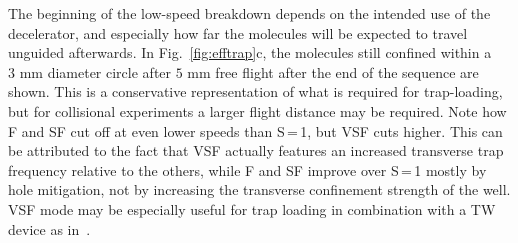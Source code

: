 \documentclass[%
 reprint,
 amsmath,amssymb,
 aps,
prl,
]{revtex4-1}
\begin{document}
The beginning of the low-speed breakdown depends on the intended use of the decelerator, and especially how far the molecules will be expected to travel unguided afterwards. 
In Fig.~\ref{fig:efftrap}c, the molecules still confined within a $3\text{ mm}$ diameter circle after $5\text{ mm}$ free flight after the end of the sequence are shown. 
This is a conservative representation of what is required for trap-loading, but for collisional experiments a larger flight distance may be required.
Note how F and SF cut off at even lower speeds than S\,=\,1, but VSF cuts higher. 
This can be attributed to the fact that VSF actually features an increased transverse trap frequency relative to the others, while F and SF improve over S\,=\,1 mostly by hole mitigation, not by increasing the transverse confinement strength of the well.
VSF mode may be especially useful for trap loading in combination with a TW device as in~\cite{Quintero-Perez2013}.

%

\end{document}
